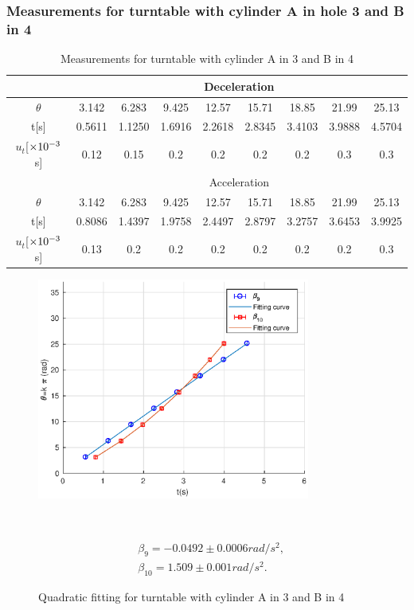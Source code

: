 \subsubsection{Measurements for turntable with cylinder A in hole 3 and B in 4}
    \begin{table}[H] \small
        \centering
        \begin{tabular}{|c|c|c|c|c|c|c|c|c|}
            \hline
            & \multicolumn{8}{c|}{Deceleration} \\\hline
            $\theta$ & 3.142 & 6.283 & 9.425 & 12.57 & 15.71 & 18.85 & 21.99 & 25.13\\\hline
            t[s] & 0.5611 & 1.1250 & 1.6916 & 2.2618 & 2.8345 & 3.4103 & 3.9888 & 4.5704\\\hline
            $u_t$[$\times10^{-3}$s] & 0.12 & 0.15 & 0.2 & 0.2 & 0.2 & 0.2 & 0.3 & 0.3\\\hline
            & \multicolumn{8}{c|}{Acceleration} \\\hline
            $\theta$ & 3.142 & 6.283 & 9.425 & 12.57 & 15.71 & 18.85 & 21.99 & 25.13\\\hline
            t[s] & 0.8086 & 1.4397 & 1.9758 & 2.4497 & 2.8797 & 3.2757 & 3.6453 & 3.9925\\\hline
            $u_t$[$\times10^{-3}$s] & 0.13 & 0.2 & 0.2 & 0.2 & 0.2 & 0.2 & 0.2 & 0.3\\\hline
        \end{tabular}
        \caption{Measurements for turntable with cylinder A in 3 and B in 4}\label{data_5}
    \end{table}

    \begin{figure}[H]
    \centering
    \begin{minipage}{0.6\textwidth}    
        \includegraphics[width=0.8\textwidth]{images/5}
        \caption{Quadratic fitting for turntable with cylinder A in 3 and B in 4}\label{fig_5}
    \end{minipage}
    ~
    \begin{minipage}{0.35\textwidth}
        \[
        \begin{split}
            &\beta_9=-0.0492\pm 0.0006rad/s^2,\\
            &\beta_{10}=1.509\pm 0.001rad/s^2.
        \end{split}
        \]
    \end{minipage}
    \end{figure}

